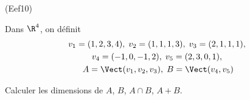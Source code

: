 \begin{tiny}(Eef10)\end{tiny} Dans $\R^4$, on définit
\begin{multline*}
  v_1=(1,2,3,4),\; v_2=(1,1,1,3),\; v_3=(2,1,1,1),\;\\
  v_4=(-1,0,-1,2),\;
  v_5=(2,3,0,1),\;\\
  A = \Vect(v_1,v_2,v_3),\; B = \Vect(v_4,v_5)
\end{multline*}

Calculer les dimensions de $A$, $B$, $A\cap B$, $A+B$.
